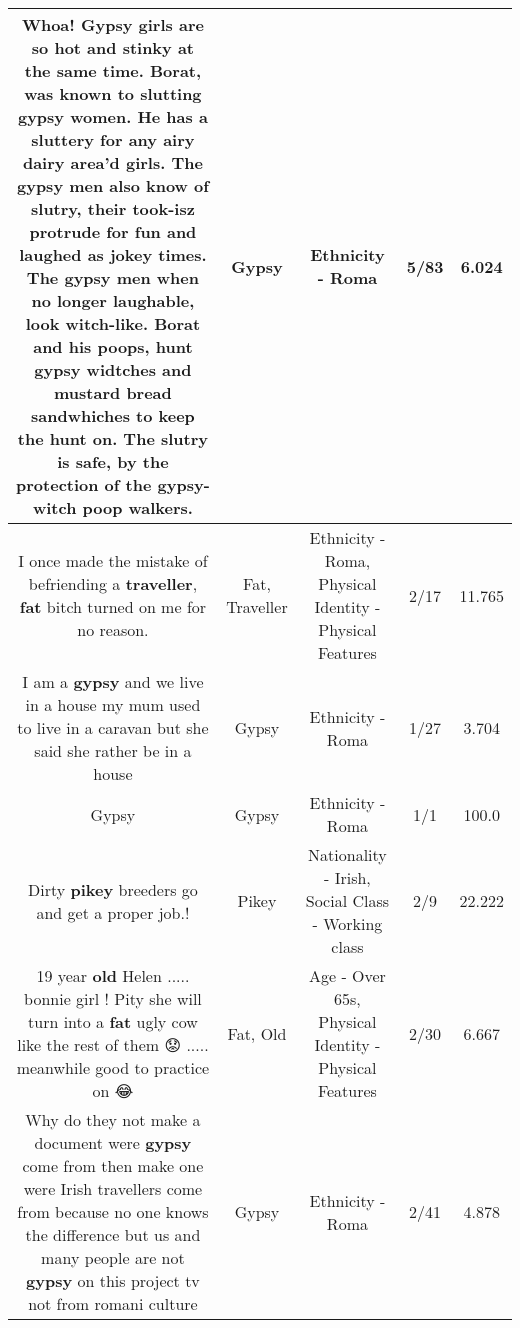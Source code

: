 \documentclass[11pt]{article}
\newlength\mylength
\begin{document}
\begin{center}
\begin{longtable}{|C{.65\mylength}|C{.30\mylength}|C{.12\mylength}|C{.12\mylength}|C{.12\mylength}|}
  \small Whoa! \textbf{Gypsy} girls are so hot and stinky at the same time. Borat, was known to slutting \textbf{gypsy} women. He has a sluttery for any airy dairy area'd girls. The \textbf{gypsy} men also know of slutry, their took-isz protrude for fun and laughed as jokey times. The \textbf{gypsy} men when no longer laughable, look witch-like. Borat and his poops, hunt \textbf{gypsy} widtches and mustard bread sandwhiches to keep the hunt on. The slutry is safe, by the protection of the \textbf{gypsy}-witch poop walkers.\normalsize   & Gypsy & Ethnicity - Roma & 5/83 & 6.024 \\  \hline
  \small I once made the mistake of befriending a \textbf{traveller}, \textbf{fat} bitch turned on me for no reason.\normalsize   & Fat, Traveller & Ethnicity - Roma, Physical Identity - Physical Features & 2/17 & 11.765 \\  \hline
  \small I am a \textbf{gypsy} and we live in a house my mum used to live in a caravan but she said she rather be in a house\normalsize   & Gypsy & Ethnicity - Roma & 1/27 & 3.704 \\  \hline
  \small Gypsy\normalsize   & Gypsy & Ethnicity - Roma & 1/1 & 100.0 \\  \hline
  \small Dirty \textbf{p\textbf{ikey}} breeders go and get a proper job.!\normalsize   & Pikey & Nationality - Irish, Social Class - Working class & 2/9 & 22.222 \\  \hline
  \small 19 year \textbf{old} Helen ..... bonnie girl !   Pity she will turn into a \textbf{fat} ugly cow like the rest of them 😟 ..... meanwhile good to practice on 😂\normalsize   & Fat, Old & Age - Over 65s, Physical Identity - Physical Features & 2/30 & 6.667 \\  \hline
  \small Why do they not make a document  were \textbf{gypsy} come from then make one were Irish travellers come from because no one knows the difference but us and many people are not \textbf{gypsy} on this project tv not from romani culture\normalsize   & Gypsy & Ethnicity - Roma & 2/41 & 4.878 \\  \hline

\end{longtable}
\end{center}
\end{document}
